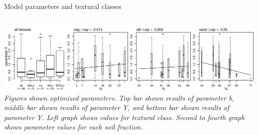 \begin{block}{Model parameters and textural classes}
\begin{columns}
\begin{column}{0.8\textwidth}
        \includegraphics[width = \textwidth]{obr/Yfittex.png}
        {\it Figures shown optimized parameters. Top bar shown results of parameter b, middle bar shown results of parameter Y, and bottom bar shown results of parameter Y. Left graph shows values for textural class. Second to fourth graph shows parameter values for each soil fraction.}
    \end{column}
\end{columns} 

\end{block}

% 
